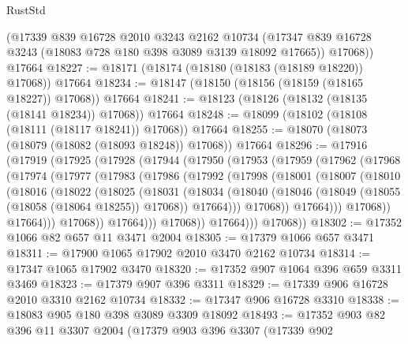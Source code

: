 \begin{lexlean}{RustStd}
\begin{coremodule}
      (@17339
        @839
        @16728
        @2010
        @3243
        @2162
        @10734
        (@17347 @839 @16728 @3243 (@18083 @728 @180 @398 @3089 @3139 @18092 @17665))
        @17068))
    @17664
@18227 := @18171 (@18174 (@18180 (@18183 (@18189 @18220)) @17068)) @17664
@18234 := @18147 (@18150 (@18156 (@18159 (@18165 @18227)) @17068)) @17664
@18241 := @18123 (@18126 (@18132 (@18135 (@18141 @18234)) @17068)) @17664
@18248 := @18099 (@18102 (@18108 (@18111 (@18117 @18241)) @17068)) @17664
@18255 := @18070 (@18073 (@18079 (@18082 (@18093 @18248)) @17068)) @17664
@18296 := @17916
    (@17919
      (@17925
        (@17928
          (@17944
            (@17950
              (@17953
                (@17959
                  (@17962
                    (@17968
                      (@17974
                        (@17977
                          (@17983
                            (@17986
                              (@17992
                                (@17998
                                  (@18001
                                    (@18007
                                      (@18010
                                        (@18016
                                          (@18022
                                            (@18025
                                              (@18031
                                                (@18034
                                                  (@18040
                                                    (@18046
                                                      (@18049
                                                        (@18055 (@18058 (@18064 @18255)) @17068))
                                                      @17664)))
                                                @17068))
                                            @17664)))
                                      @17068))
                                  @17664)))
                            @17068))
                        @17664)))
                  @17068))
              @17664)))
        @17068))
@18302 := @17352 @1066 @82 @657 @11 @3471 @2004
@18305 := @17379 @1066 @657 @3471
@18311 := @17900 @1065 @17902 @2010 @3470 @2162 @10734
@18314 := @17347 @1065 @17902 @3470
@18320 := @17352 @907 @1064 @396 @659 @3311 @3469
@18323 := @17379 @907 @396 @3311
@18329 := @17339 @906 @16728 @2010 @3310 @2162 @10734
@18332 := @17347 @906 @16728 @3310
@18338 := @18083 @905 @180 @398 @3089 @3309 @18092
@18493 := @17352
    @903
    @82
    @396
    @11
    @3307
    @2004
    (@17379
      @903
      @396
      @3307
      (@17339
        @902

\end{coremodule}
\end{lexlean}
